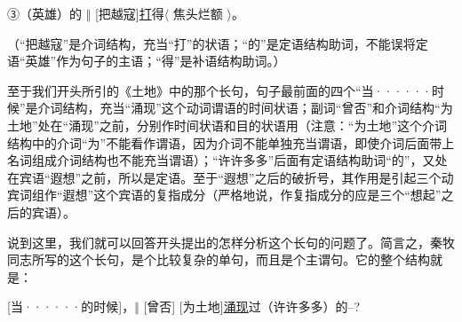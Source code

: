 ③（英雄）的 $\Vert$ [把越寇]\uline{打}得$\langle$ 焦头烂额 $\rangle$。

（“把越寇”是介词结构，充当“打”的状语；“的”是定语结构助词，不能误将定语“英雄”作为句子的主语；“得”是补语结构助词。）

至于我们开头所引的《土地》中的那个长句，句子最前面的四个“当······时候”是介词结构，充当“涌现”这个动词谓语的时间状语；副词“曾否”和介词结构“为土地”处在“涌现”之前，分别作时间状语和目的状语用（注意：“为土地”这个介词结构中的介词“为”不能看作谓语，因为介词不能单独充当谓语，即使介词后面带上名词组成介词结构也不能充当谓语）；“许许多多”后面有定语结构助词“的”，又处在宾语“遐想”之前，所以是定语。至于“遐想”之后的破折号，其作用是引起三个动宾词组作“遐想”这个宾语的复指成分（严格地说，作复指成分的应是三个“想起”之后的宾语）。

说到这里，我们就可以回答开头提出的怎样分析这个长句的问题了。简言之，秦牧同志所写的这个长句，是个比较复杂的单句，而且是个主谓句。它的整个结构就是：

[当······的时候]，$\Vert$ [曾否] [为土地]\uline{涌现}过（许许多多）的--?
\newpage